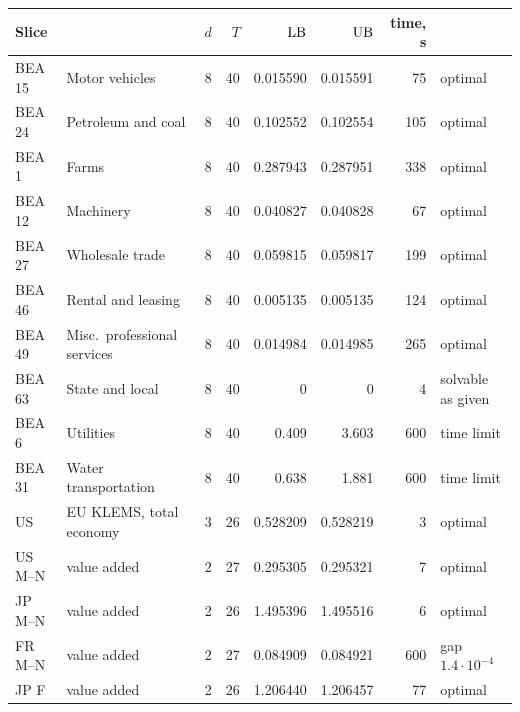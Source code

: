 \begin{table}[t]
{\small\begin{tabular}{llrrrrrl}
\toprule
Slice & & $d$ & $T$ & $\mathrm{LB}$ & $\mathrm{UB}$ & time, s & \\
\midrule
BEA 15 & Motor vehicles & 8 & 40 & 0.015590 & 0.015591 & 75 & optimal \\
BEA 24 & Petroleum and coal & 8 & 40 & 0.102552 & 0.102554 & 105 & optimal \\
BEA 1 & Farms & 8 & 40 & 0.287943 & 0.287951 & 338 & optimal \\
BEA 12 & Machinery & 8 & 40 & 0.040827 & 0.040828 & 67 & optimal \\
BEA 27 & Wholesale trade & 8 & 40 & 0.059815 & 0.059817 & 199 & optimal \\
BEA 46 & Rental and leasing & 8 & 40 & 0.005135 & 0.005135 & 124 & optimal \\
BEA 49 & Misc.\ professional services & 8 & 40 & 0.014984 & 0.014985 & 265 & optimal \\
BEA 63 & State and local & 8 & 40 & 0 & 0 & 4 & solvable as given \\
BEA 6 & Utilities & 8 & 40 & 0.409 & 3.603 & 600 & time limit \\
BEA 31 & Water transportation & 8 & 40 & 0.638 & 1.881 & 600 & time limit \\
US & EU KLEMS, total economy & 3 & 26 & 0.528209 & 0.528219 & 3 & optimal \\
US M--N & value added & 2 & 27 & 0.295305 & 0.295321 & 7 & optimal \\
JP M--N & value added & 2 & 26 & 1.495396 & 1.495516 & 6 & optimal \\
FR M--N & value added & 2 & 27 & 0.084909 & 0.084921 & 600 & gap $1.4\cdot10^{-4}$ \\
JP F & value added & 2 & 26 & 1.206440 & 1.206457 & 77 & optimal \\
\bottomrule
\end{tabular}}
{}
\end{table}

